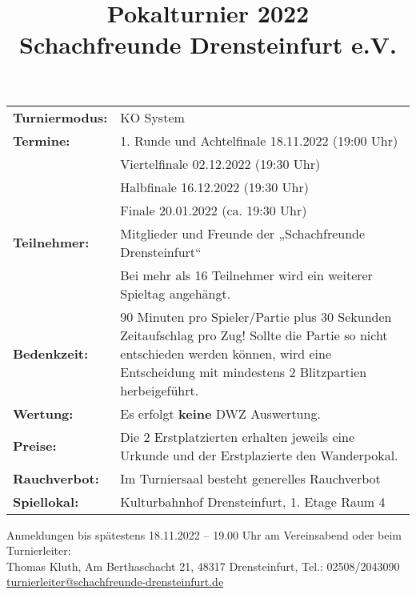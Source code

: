 \documentclass[a4paper,parskip=full-,DIV18]{scrartcl}
\title{Pokalturnier 2022\\Schachfreunde Drensteinfurt e.V.}
\date{}
\begin{document}
\maketitle


\bigskip

\begin{tabular}{p{3 cm} p{13.5 cm}}
	\textbf{Turniermodus:} & KO System                                                                                 \\
	\textbf{Termine:}      & 1. Runde und Achtelfinale 18.11.2022 (19:00 Uhr)                                           \\
	                       & Viertelfinale 02.12.2022 (19:30 Uhr)                                                   \\
	                       & Halbfinale 16.12.2022 (19:30 Uhr)                                                          \\
	                       & Finale 20.01.2022 (ca. 19:30 Uhr)                                                          \\
	\textbf{Teilnehmer:}   & Mitglieder und Freunde der „Schachfreunde Drensteinfurt“                                   \\
	\textbf{}              & Bei mehr als 16 Teilnehmer wird ein weiterer Spieltag angehängt. \\
	\textbf{Bedenkzeit:}   & 90 Minuten pro Spieler/Partie plus 30 Sekunden Zeitaufschlag pro Zug! Sollte die Partie so nicht entschieden werden können, wird eine Entscheidung mit  mindestens 2 Blitzpartien herbeigeführt.                      \\
	\textbf{Wertung:}      & Es erfolgt \textbf{keine} DWZ Auswertung.                                                  \\
	\textbf{Preise:}       & Die 2 Erstplatzierten erhalten jeweils eine Urkunde und der Erstplazierte den Wanderpokal. \\
	\textbf{Rauchverbot:}  & Im Turniersaal besteht generelles Rauchverbot                                              \\
	\textbf{Spiellokal:}   & Kulturbahnhof Drensteinfurt, 1. Etage Raum 4
\end{tabular}


\bigskip

Anmeldungen bis spätestens 18.11.2022 – 19.00 Uhr am Vereinsabend oder beim Turnierleiter:\\
Thomas Kluth, Am Berthaschacht 21, 48317 Drensteinfurt, Tel.: 02508/2043090\\
\href{mailto:turnierleiter@schachfreunde-drensteinfurt.de}{turnierleiter@schachfreunde-drensteinfurt.de}
\end{document}

